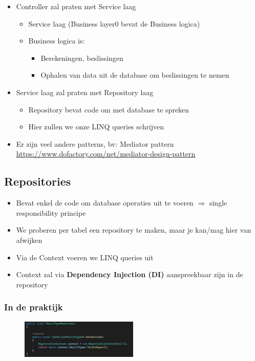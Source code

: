 \documentclass{article}
\begin{document}
\begin{itemize}
    \item Controller zal praten met Service laag
    \begin{itemize}
        \item Service laag (Business layer0 bevat de Business logica)
        \item Business logica is:
        \begin{itemize}
            \item Berekeningen, beslissingen
            \item Ophalen van data uit de database om beslissingen te nemen
        \end{itemize}
    \end{itemize}
    \item Service laag zal praten met Repository laag
    \begin{itemize}
        \item Repository bevat code om met database te spreken
        \item Hier zullen we onze LINQ queries schrijven
    \end{itemize}
    \item Er zijn veel andere patterns, bv: Mediator pattern \url{https://www.dofactory.com/net/mediator-design-pattern}
\end{itemize}

\subsection{Repositories}

\begin{itemize}
    \item Bevat enkel de code om database operaties uit te voeren $\Rightarrow$ single responsibility principe
    \item We proberen per tabel een repository te maken, maar je kan/mag hier van afwijken
    \item Via de Context voeren we LINQ queries uit
    \item Context zal via \textbf{Dependency Injection (DI)} aanspreekbaar zijn in de repository
\end{itemize}

\subsubsection{In de praktijk}

\begin{figure}[H]
    \centering
    \includegraphics[width=0.5\textwidth]{repositories-1.png}
\end{figure}
\end{document}
